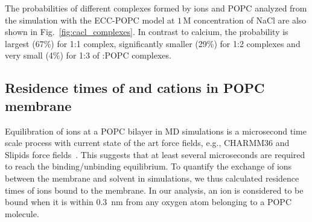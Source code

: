 \documentclass[aip,jcp,twocolumn]{revtex4}
\begin{document}
The probabilities of different complexes formed by  ions and POPC
analyzed from the simulation with the ECC-POPC model at $1\,$M concentration of NaCl are also 
shown in Fig.~\ref{fig:cacl_complexes}. In contrast to calcium, the
probability is largest (67\%) for 1:1 complex, significantly smaller (29\%)
for 1:2 complexes and very small (4\%) for 1:3 of :POPC complexes.




\subsection{Residence times of  and  cations in POPC membrane}

Equilibration of  ions at a POPC bilayer in MD simulations is a microsecond time scale process with current state of the art force fields, e.g., CHARMM36 and Slipids force fields~\cite{javanainen17}. This suggests that at least several microseconds are required to reach the binding/unbinding equilibrium.
To quantify the exchange of ions between the membrane and solvent in simulations, we thus calculated residence times of ions bound to the membrane. In our analysis, an ion is considered to be bound when it is within 0.3~nm from any oxygen atom belonging to a POPC molecule.
\end{document}
